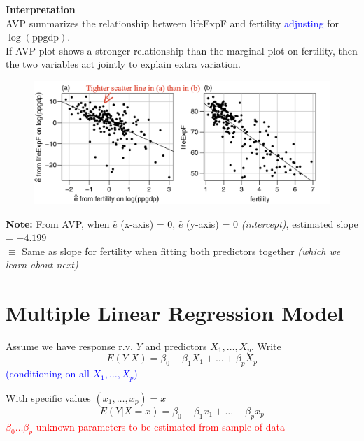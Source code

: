 \documentclass[14pt]{extarticle}
\begin{document}
\noindent
\textbf{Interpretation}\\
AVP summarizes the relationship between lifeExpF and fertility \textcolor{blue}{adjusting} for $\log(\text{ppgdp})$.\\
If AVP plot shows a stronger relationship than the marginal plot on fertility, then the two variables act jointly to explain extra variation.
\begin{figure}[H]
    \centering
    \includegraphics[width=1\textwidth]{fig6.png}
\end{figure}
\noindent
\textbf{Note:}
From AVP, when $\hat{e}$ (x-axis) = 0, $\hat{e}$ (y-axis) = 0 \textit{(intercept)}, estimated slope = $-4.199$\\
$\equiv$ Same as slope for fertility when fitting both predictors together \textit{(which we learn about next)}

\section*{Multiple Linear Regression Model}

\noindent
Assume we have response r.v. $Y$ and predictors $X_1, \dots, X_p$.
\noindent
Write
\[
E\left( Y | X \right) = \beta_0 + \beta_1 X_1 + \dots + \beta_p X_p
\]
\textcolor{blue}{\quad \quad \quad \quad \quad \quad \quad \quad (conditioning on all $X_1, \dots, X_p$)}

\noindent
With specific values $\left(x_1, \dots, x_p\right) = x$
\[
E(Y | X = x) = \beta_0 + \beta_1 x_1 + \dots + \beta_p x_p
\]
\noindent
\textcolor{red}{$\beta_0 \dots \beta_p$ unknown parameters to be estimated from sample of data}
\end{document}

